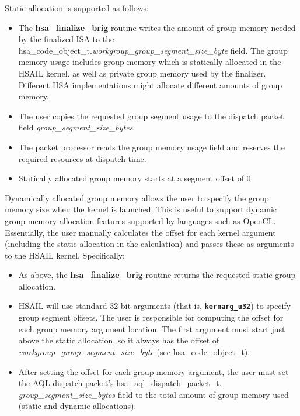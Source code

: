 \documentclass[draft]{book}
\newcommand{\diffblock}[1]{#1}
\newcommand{\ttbf}[1]{\diffblock{\texttt{\textbf{#1}}}}
\newcommand{\reffun}[1]{\textbf{#1}}
\newcommand{\reffld}[1]{\textit{#1}}
\newcommand{\reftyp}[1]{#1}
\begin{document}
Static allocation is supported as follows:
\begin{itemize}
\item The \reffun{hsa_finalize_brig} routine writes the amount of group memory
  needed by the finalized ISA to the
  \reftyp{hsa_code_object_t}.\reffld{workgroup_group_segment_size_byte}
  field. The group memory usage includes group memory which is statically
  allocated in the HSAIL kernel, as well as private group memory used by the
  finalizer. Different HSA implementations might allocate different amounts of
  group memory.

\item The user copies the requested group segment usage to the dispatch packet
  field \reffld{group_segment_size_bytes}.

\item The packet processor reads the group memory usage field and reserves the
  required resources at dispatch time.

\item Statically allocated group memory starts at a segment offset of 0.

\end{itemize}

Dynamically allocated group memory allows the user to specify the group memory
size when the kernel is launched. This is useful to support dynamic group memory
allocation features supported by languages such as OpenCL. Essentially, the user
manually calculates the offset for each kernel argument (including the static
allocation in the calculation) and passes these as arguments to the HSAIL
kernel. Specifically:

\begin{itemize}

\item As above, the \reffun{hsa_finalize_brig} routine returns the requested
  static group allocation.

\item HSAIL will use standard 32-bit arguments (that is, \ttbf{kernarg_u32})
  to specify group segment offsets. The user is responsible for computing the
  offset for each group memory argument location. The first argument must start
  just above the static allocation, so it always has the offset of
  \reffld{workgroup_group_segment_size_byte} (see
  \reftyp{hsa_code_object_t}).

\item After setting the offset for each group memory argument, the user must set
  the AQL dispatch packet's \reftyp{hsa_aql_dispatch_packet_t}.\reffld{
    group_segment_size_bytes} field to the total amount of group memory used
  (static and dynamic allocations).

\end{itemize}
\end{document}
